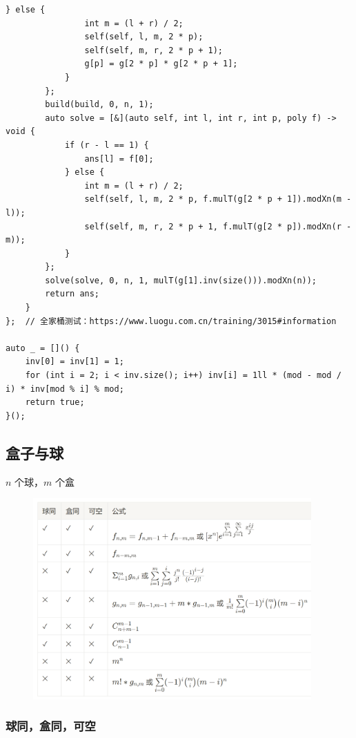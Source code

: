 \documentclass[UTF8, twoside]{ctexart}
\begin{document}
\begin{sloppypar}
\begin{lstlisting}[style=cpp]
            } else {
                int m = (l + r) / 2;
                self(self, l, m, 2 * p);
                self(self, m, r, 2 * p + 1);
                g[p] = g[2 * p] * g[2 * p + 1];
            }
        };
        build(build, 0, n, 1);
        auto solve = [&](auto self, int l, int r, int p, poly f) -> void {
            if (r - l == 1) {
                ans[l] = f[0];
            } else {
                int m = (l + r) / 2;
                self(self, l, m, 2 * p, f.mulT(g[2 * p + 1]).modXn(m - l));
                self(self, m, r, 2 * p + 1, f.mulT(g[2 * p]).modXn(r - m));
            }
        };
        solve(solve, 0, n, 1, mulT(g[1].inv(size())).modXn(n));
        return ans;
    }
};  // 全家桶测试：https://www.luogu.com.cn/training/3015#information

auto _ = []() {
    inv[0] = inv[1] = 1;
    for (int i = 2; i < inv.size(); i++) inv[i] = 1ll * (mod - mod / i) * inv[mod % i] % mod;
    return true;
}();
\end{lstlisting}
\subsection{盒子与球}

$n$ 个球，$m$ 个盒

\begin{figure}[H]
    \flushleft
    \includegraphics[width=0.95\textwidth]{box-and-ball.png}
    \label{fig:left}
\end{figure}

\subsubsection{球同，盒同，可空}


\end{sloppypar}
\end{document}
